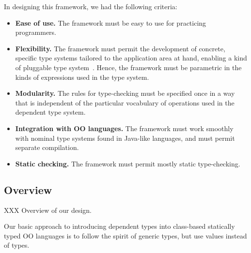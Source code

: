 %
%
%
%
%

In designing this framework, we had the following criteria:
\begin{itemize}
\item 
{\bf Ease of use.}
The framework must be 
easy to use for practicing programmers.

\item
{\bf Flexibility.}
The framework
must permit the development of concrete,
specific type systems tailored to the application area at
hand, enabling a kind of pluggable type system~\cite{bracha04-pluggable}.
Hence, the framework must be parametric in the kinds of
expressions used in the type system.

\item
{\bf Modularity.}
The rules for type-checking
must be specified once in a way that is independent of the
particular vocabulary of operations used in the dependent type
system.

\item
{\bf Integration with OO languages.}
The framework must
work smoothly with nominal type systems found in Java-like
languages, and must permit separate compilation.

\item
{\bf Static checking.}
The framework must permit mostly static type-checking. 
\end{itemize}

\subsection{Overview}

XXX Overview of our design.

Our basic approach to introducing dependent types into
class-based statically typed OO languages is to
follow the spirit of generic types, but use values instead of
types.


